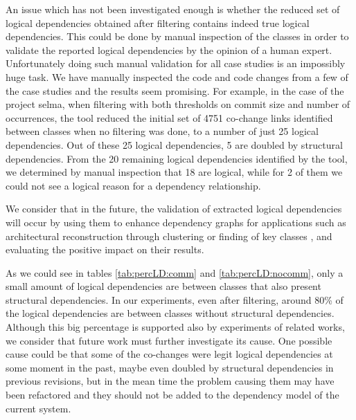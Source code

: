 \documentclass[a4paper,twoside]{article}
\begin{document}
An issue which has not been investigated enough is whether the reduced set of logical dependencies obtained after filtering contains indeed true logical dependencies. This could be done by manual inspection of the classes in order to validate the reported logical dependencies by the opinion of a human expert. Unfortunately doing such manual validation for all case studies is an impossibly huge task. We have manually inspected the code and code changes from a few of the case studies and the results seem promising. For example, in the case of the project selma, when filtering with both thresholds on commit size and number of occurrences, the tool reduced the initial set of 4751 co-change links identified between classes when no filtering was done, to a number of just 25 logical dependencies. Out of these 25 logical dependencies, 5 are doubled by structural dependencies. From the 20 remaining logical dependencies identified by the tool, we determined by manual inspection that 18 are logical, while for 2 of them we could not see a logical reason for a dependency relationship. 

We consider that in the future, the validation of extracted logical dependencies will occur by using them to enhance dependency graphs for  applications such as architectural reconstruction through clustering \cite{SoraConti} or finding of key classes \cite{PagerankENASE}, and evaluating the positive impact on their results.   


As we could see in tables \ref{tab:percLD:comm} and \ref{tab:percLD:nocomm}, only a small amount of logical dependencies are between classes that also present structural dependencies.  In our experiments, even after filtering, around 80\% of the logical dependencies are between classes without structural dependencies. Although this big percentage is supported also by experiments of related works, we consider that future work must further investigate its cause. One possible cause could be that some of the co-changes were legit logical dependencies at some moment in the past, maybe even doubled by structural dependencies in previous revisions, but in the mean time the problem causing them may have been refactored and they should not be added to the dependency model of the current system.  
\end{document}
